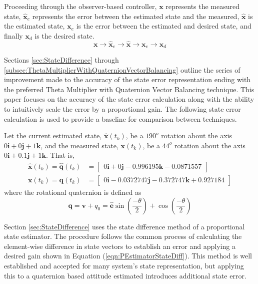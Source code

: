 \documentclass[]{aiaa-tc}%
\newcommand{\bs}[1]{\boldsymbol{#1}}
\begin{document}
Proceeding through the observer-based controller, $\bs{x}$ represents the measured state, $\bs{\hat{x}}_e$ represents the error between the estimated state and the measured, $\bs{\hat{x}}$ is the estimated state, $\bs{x}_e$ is the error between the estimated and desired state, and finally $\bs{x}_d$ is the desired state.
\begin{equation}
  \bs{x} \to \bs{\hat{x}}_e \to \bs{\hat{x}} \to \bs{x}_e \to \bs{x}_d
\end{equation}

Sections \ref{sec:StateDifference} through \ref{subsec:ThetaMultiplierWithQuaternionVectorBalancing} outline the series of improvement made to the accuracy of the state error representation ending with the preferred Theta Multiplier with Quaternion Vector Balancing technique.  This paper focuses on the accuracy of the state error calculation along with the ability to intuitively scale the error by a proportional gain.  The following state error calculation is used to provide a baseline for comparison between techniques.

Let the current estimated state, $\bs{\hat{x}}(t_{k})$, be a $190^o$ rotation about the axis $0 \bs{i} + 0 \bs{j} + 1\bs{k}$, and the measured state, $\bs{x}(t_{k})$, be a $44^o$ rotation about the axis $0 \bs{i} + 0.1 \bs{j} + 1\bs{k}$.  That is,
\begin{subequations}
  \begin{align}
    \bs{\hat{x}}(t_{k}) = \bs{\hat{q}}(t_{k})
    &= \begin{bmatrix} 0 \bs{i} +0 \bs{j} -0.996195 \bs{k} -0.0871557 \end{bmatrix}\\
    \bs{x}(t_{k}) = \bs{q}(t_{k})
    &= \begin{bmatrix} 0 \bs{i} -0.0372747 \bs{j} -0.372747 \bs{k} +0.927184  \end{bmatrix}
  \end{align}
  \label{eqn:StateDifferenceQuaternionSamples}
\end{subequations}
where the rotational quaternion is defined as
\begin{equation}
  \bs{q} = \bs{v} + q_0 = \hat{\bs{e}} \sin \left( \frac{-\theta}{2} \right) + \cos \left( \frac{-\theta}{2} \right)
  \label{eqn:RotationalQuaternionDefinition}
\end{equation}

Section \ref{sec:StateDifference} uses the state difference method of a proportional state estimator.  The procedure follows the common process of calculating the element-wise difference in state vectors to establish an error and applying a desired gain shown in Equation (\ref{eqn:PEstimatorStateDiff}).  This method is well established and accepted for many system's state representation, but applying this to a quaternion based attitude estimated introduces additional state error.
\end{document}
